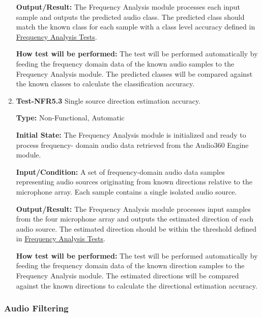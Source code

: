 \documentclass[12pt, titlepage]{article}
\begin{document}
\begin{enumerate}
\textbf{Output/Result:}
The Frequency Analysis module processes each input sample and outputs the
predicted audio class. The predicted class should match the known class for
each sample with a class level accuracy defined in 
\hyperref[sec:freq-analysis-tests]{Frequency Analysis Tests}.

\textbf{How test will be performed:}
The test will be performed automatically by feeding the frequency
domain data of the known audio samples to the Frequency Analysis module. The
predicted classes will be compared against the known classes to calculate
the classification accuracy.

\item{\textbf{Test-NFR5.3} Single source direction estimation accuracy.\\}

\textbf{Type:} Non-Functional, Automatic

\textbf{Initial State:}
The Frequency Analysis module is initialized and ready to process frequency-
domain audio data retrieved from the Audio360 Engine module.

\textbf{Input/Condition:}
A set of frequency-domain audio data samples representing audio sources
originating from known directions relative to the microphone array. Each
sample contains a single isolated audio source.

\textbf{Output/Result:}
The Frequency Analysis module processes input samples from the four microphone
array and outputs the estimated direction of each audio source. The estimated
direction should be within the threshold defined in 
\hyperref[sec:freq-analysis-tests]{Frequency Analysis Tests}.

\textbf{How test will be performed:}
The test will be performed automatically by feeding the frequency
domain data of the known direction samples to the Frequency Analysis module.
The estimated directions will be compared against the known directions to
calculate the directional estimation accuracy.


\end{enumerate}

\subsubsection{Audio Filtering}
\end{document}
